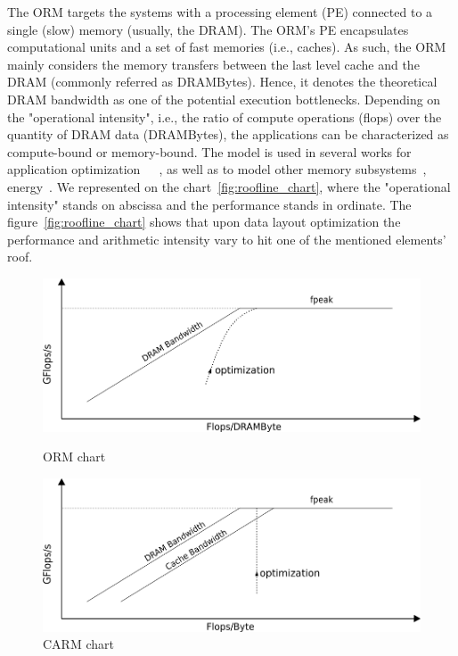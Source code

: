 \documentclass[twoside,twocolumn,8pt]{extarticle}
\begin{document}
The ORM targets the systems with a processing element (PE) connected to a single (slow) memory (usually, the DRAM). The ORM's
PE encapsulates computational units and a set of fast memories (i.e., caches). As such, the ORM mainly considers the memory
transfers between the last level cache and the DRAM (commonly referred as DRAMBytes). Hence, it denotes the theoretical DRAM
bandwidth as one of the potential execution bottlenecks. Depending on the "operational intensity", i.e., the ratio of compute
operations (flops) over the quantity of DRAM data (DRAMBytes), the applications can be characterized as compute-bound or
memory-bound. The model is used in several works for application
optimization~\cite{Kim20111201}~\cite{Rossinelli2164}~\cite{vanNieuwpoort:2009:UMH:1542275.1542337}, as well as to model other
memory subsystems~\cite{manyTaskRuntimeRooflneModel}, energy~\cite{7493653}. We represented on the chart~\ref{fig:roofline_chart},
where the "operational intensity" stands on abscissa and the performance stands in ordinate.
The figure~\ref{fig:roofline_chart} shows that upon data layout optimization the performance and arithmetic intensity vary to hit
one of the mentioned elements' roof.

\begin{figure}
\begin{center}
  \begin{minipage}[b]{0.49\textwidth}
    \includegraphics[width=\textwidth]{pictures/roofline_chart}
    \caption{ORM chart}
    \label{fig:roofline_chart}
  \end{minipage}
  \hfill
  \begin{minipage}[b]{0.49\textwidth}
    \includegraphics[width=\textwidth]{pictures/CARM_chart}
    \caption{CARM chart}
    \label{fig:CARM_chart}
  \end{minipage}
  \end{center}
\end{figure}
\end{document}
